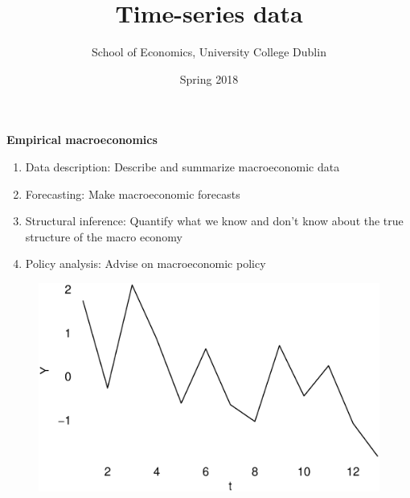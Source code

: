 \documentclass{beamer}
\title{Time-series data}
\author{School of Economics, University College Dublin}
\date{Spring 2018}
\begin{document}
\begin{frame}
 \titlepage
\end{frame}

\begin{frame}
  \textbf{Empirical macroeconomics}
  \begin{enumerate}
  \item Data description: Describe and summarize macroeconomic data 
  \item Forecasting: Make macroeconomic forecasts 
  \item Structural inference: Quantify what we know and don't know about the true structure of the macro economy 
  \item Policy analysis: Advise on macroeconomic policy 
  \end{enumerate}
\end{frame}

\begin{frame}
  \begin{figure}
    \includegraphics[scale=.4]{ts_example.eps}
  \end{figure}
\end{frame}
\end{document}
